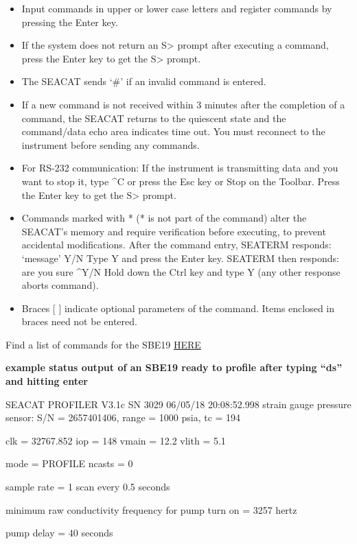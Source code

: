 \documentclass[]{book}
\providecommand{\tightlist}{%
  \setlength{\itemsep}{0pt}\setlength{\parskip}{0pt}}
\begin{document}
\begin{itemize}
\tightlist
\item
  Input commands in upper or lower case letters and register commands by pressing the Enter key.
\item
  If the system does not return an S\textgreater{} prompt after executing a command, press the Enter key to get the S\textgreater{} prompt.
\item
  The SEACAT sends `\#' if an invalid command is entered.
\item
  If a new command is not received within 3 minutes after the completion of a command, the SEACAT returns to the quiescent state and the command/data echo area indicates time out. You must reconnect to the instrument before sending any commands.
\item
  For RS-232 communication: If the instrument is transmitting data and you want to stop it, type \^{}C or press the Esc key or Stop on the Toolbar. Press the Enter key to get the S\textgreater{} prompt.
\item
  Commands marked with * (* is not part of the command) alter the SEACAT's memory and require verification before executing, to prevent accidental modifications.
  After the command entry, SEATERM responds:
  `message' Y/N Type Y and press the Enter key.
  SEATERM then responds:
  are you sure \^{}Y/N Hold down the Ctrl key and type Y (any other response aborts command).
\item
  Braces {[} {]} indicate optional parameters of the command. Items enclosed in braces need not be entered.
\end{itemize}

Find a list of commands for the SBE19 \href{https://docs.google.com/document/d/1WkYxlEDpUm_A1JY6Fx7Kq8Fi2c_drbbzcXDoJRtYLZk/edit}{HERE}

\textbf{example status output of an SBE19 ready to profile after typing ``ds'' and hitting enter}

SEACAT PROFILER V3.1c SN 3029 06/05/18 20:08:52.998
strain gauge pressure sensor: S/N = 2657401406, range = 1000 psia, tc = 194

clk = 32767.852 iop = 148 vmain = 12.2 vlith = 5.1

mode = PROFILE ncasts = 0

sample rate = 1 scan every 0.5 seconds

minimum raw conductivity frequency for pump turn on = 3257 hertz

pump delay = 40 seconds
\end{document}
